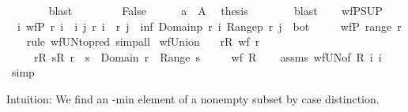 \begin{isabellebody}
\ \ \ \ \ \ \isamarkupfalse%
\ blast\isanewline
\ \ \isamarkupfalse%
\isanewline
\ \ \ \ \isamarkupfalse%
\ False\isanewline
\ \ \ \ \isamarkupfalse%
\ {\isacartoucheopen}a\ {\isasymin}\ A{\isacartoucheclose}\ \isamarkupfalse%
\ {\isacharquery}{\kern0pt}thesis\isanewline
\ \ \ \ \ \ \isamarkupfalse%
\ blast\isanewline
\ \ \isamarkupfalse%
\isanewline
{}\isamarkupfalse%
%
\endisatagproof
{\isafoldproof}%
%
\isadelimproof
\isanewline
%
\endisadelimproof
\isanewline
{}\isamarkupfalse%
\ wfP{\isacharunderscore}{\kern0pt}SUP{\isacharcolon}{\kern0pt}\isanewline
\ \ {\isachardoublequoteopen}{\isasymforall}i{\isachardot}{\kern0pt}\ wfP\ {\isacharparenleft}{\kern0pt}r\ i{\isacharparenright}{\kern0pt}\ {\isasymLongrightarrow}\ {\isasymforall}i\ j{\isachardot}{\kern0pt}\ r\ i\ {\isasymnoteq}\ r\ j\ {\isasymlongrightarrow}\ inf\ {\isacharparenleft}{\kern0pt}Domainp\ {\isacharparenleft}{\kern0pt}r\ i{\isacharparenright}{\kern0pt}{\isacharparenright}{\kern0pt}\ {\isacharparenleft}{\kern0pt}Rangep\ {\isacharparenleft}{\kern0pt}r\ j{\isacharparenright}{\kern0pt}{\isacharparenright}{\kern0pt}\ {\isacharequal}{\kern0pt}\ bot\ {\isasymLongrightarrow}\isanewline
\ \ \ \ wfP\ {\isacharparenleft}{\kern0pt}{\isasymSqunion}{\isacharparenleft}{\kern0pt}range\ r{\isacharparenright}{\kern0pt}{\isacharparenright}{\kern0pt}{\isachardoublequoteclose}\isanewline
%
\isadelimproof
\ \ %
\endisadelimproof
%
\isatagproof
{}\isamarkupfalse%
\ {\isacharparenleft}{\kern0pt}rule\ wf{\isacharunderscore}{\kern0pt}UN{\isacharbrackleft}{\kern0pt}to{\isacharunderscore}{\kern0pt}pred{\isacharbrackright}{\kern0pt}{\isacharparenright}{\kern0pt}\ simp{\isacharunderscore}{\kern0pt}all%
\endisatagproof
{\isafoldproof}%
%
\isadelimproof
\isanewline
%
\endisadelimproof
\isanewline
{}\isamarkupfalse%
\ wf{\isacharunderscore}{\kern0pt}Union{\isacharcolon}{\kern0pt}\isanewline
\ \ \ {\isachardoublequoteopen}{\isasymforall}r{\isasymin}R{\isachardot}{\kern0pt}\ wf\ r{\isachardoublequoteclose}\isanewline
\ \ \ \ \ {\isachardoublequoteopen}{\isasymforall}r{\isasymin}R{\isachardot}{\kern0pt}\ {\isasymforall}s{\isasymin}R{\isachardot}{\kern0pt}\ r\ {\isasymnoteq}\ s\ {\isasymlongrightarrow}\ Domain\ r\ {\isasyminter}\ Range\ s\ {\isacharequal}{\kern0pt}\ {\isacharbraceleft}{\kern0pt}{\isacharbraceright}{\kern0pt}{\isachardoublequoteclose}\isanewline
\ \ \ {\isachardoublequoteopen}wf\ {\isacharparenleft}{\kern0pt}{\isasymUnion}R{\isacharparenright}{\kern0pt}{\isachardoublequoteclose}\isanewline
%
\isadelimproof
\ \ %
\endisadelimproof
%
\isatagproof
{}\isamarkupfalse%
\ assms\ wf{\isacharunderscore}{\kern0pt}UN{\isacharbrackleft}{\kern0pt}of\ R\ {\isachardoublequoteopen}{\isasymlambda}i{\isachardot}{\kern0pt}\ i{\isachardoublequoteclose}{\isacharbrackright}{\kern0pt}\ \isamarkupfalse%
\ simp%
\endisatagproof
{\isafoldproof}%
%
\isadelimproof
%
\endisadelimproof
%
\begin{isamarkuptext}%
Intuition: We find an -min element of a nonempty subset  by case distinction.


\end{isamarkuptext}
\end{isabellebody}
